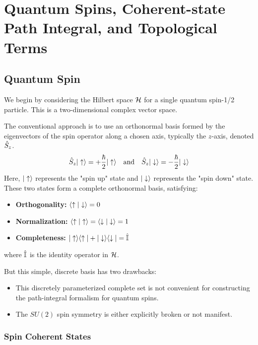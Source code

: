 \part{Quantum Spins, Coherent-state Path Integral, and Topological Terms}

\chapter{Quantum Spin}

We begin by considering the Hilbert space $\mathcal{H}$ for a single quantum spin-1/2 particle. This is a two-dimensional complex vector space.

The conventional approach is to use an orthonormal basis formed by the eigenvectors of the spin operator along a chosen axis, typically the $z$-axis, denoted $\hat{S}_z$.
\begin{equation}
    \hat{S}_z |\uparrow\rangle = +\frac{\hbar}{2} |\uparrow\rangle \quad \text{and} \quad \hat{S}_z |\downarrow\rangle = -\frac{\hbar}{2} |\downarrow\rangle
\end{equation}
Here, $|\uparrow\rangle$ represents the "spin up" state and $|\downarrow\rangle$ represents the "spin down" state. These two states form a complete orthonormal basis, satisfying:
\begin{itemize}
    \item \textbf{Orthogonality:} $\langle\uparrow|\downarrow\rangle = 0$
    \item \textbf{Normalization:} $\langle\uparrow|\uparrow\rangle = \langle\downarrow|\downarrow\rangle = 1$
    \item \textbf{Completeness:} $|\uparrow\rangle\langle\uparrow| + |\downarrow\rangle\langle\downarrow| = \hat{\mathbb{I}}$
\end{itemize}
where $\hat{\mathbb{I}}$ is the identity operator in $\mathcal{H}$.

But this simple, discrete basis has two drawbacks:
\begin{itemize}
    \item This discretely parameterized complete set
    is not convenient for constructing the path-integral formalism for quantum spins.
    \item The $SU(2)$ spin symmetry is either explicitly broken or not manifest.
\end{itemize}

\section{Spin Coherent States}

